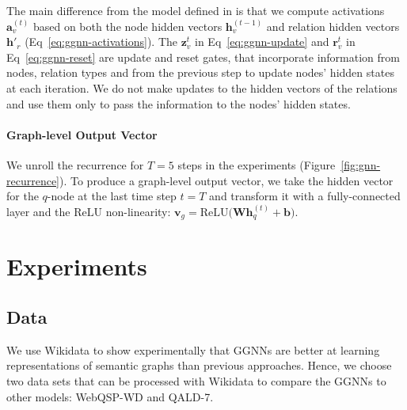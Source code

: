 \documentclass[11pt]{article}
\begin{document}
The main difference from the model defined in  is that we compute activations $\mathbf{a}_v^{(t)}$ based on both the node hidden vectors $\mathbf{h}_v^{(t-1)}$ and relation hidden vectors $\mathbf{h}'_r$ (Eq~\ref{eq:ggnn-activations}). The $\mathbf{z}_v^t$ in Eq~\ref{eq:ggnn-update} and $\mathbf{r}_v^t$ in Eq~\ref{eq:ggnn-reset} are update and reset gates, that incorporate information from nodes, relation types and from the previous step to update nodes' hidden states at each iteration. We do not make updates to the hidden vectors of the relations and use them only to pass the information to the nodes' hidden states.   

\paragraph{Graph-level Output Vector} We unroll the recurrence for $T=5$ steps in the experiments (Figure~\ref{fig:gnn-recurrence}). To produce a graph-level output vector, we take the hidden vector for the $q$-node at the last time step $t=T$ and transform it with a fully-connected layer and the $\mathrm{ReLU}$ non-linearity:
$ \mathbf{v}_g = \mathrm{ReLU} \big(\mathbf{W}\mathbf{h}_q^{(t)} + \mathbf{b} \big)$.


\section{Experiments}

\subsection{Data}
\label{sec:datasets}

We use Wikidata to show experimentally that GGNNs are better at learning representations of semantic graphs than previous approaches. Hence, we choose two data sets that can be processed with Wikidata to compare the GGNNs to other models: WebQSP-WD and QALD-7.
\end{document}
